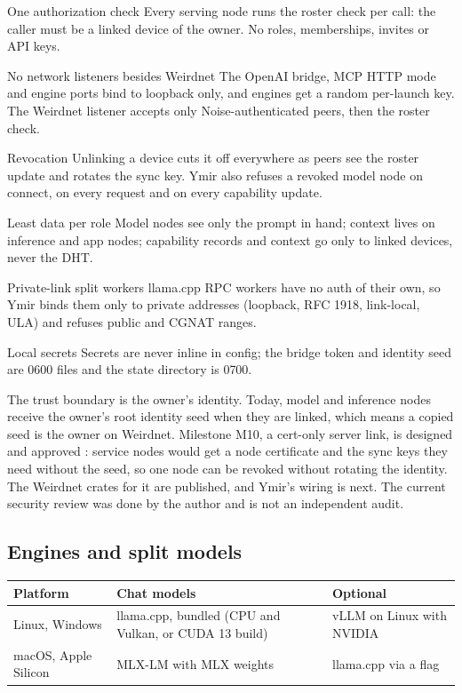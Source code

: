 \begin{rowlist}
  \item[One authorization check] Every serving node runs the roster check per call: the caller must be a linked device of the owner. No roles, memberships, invites or API keys.
  \item[No network listeners besides Weirdnet] The OpenAI bridge, MCP HTTP mode and engine ports bind to loopback only, and engines get a random per-launch key. The Weirdnet listener accepts only Noise-authenticated peers, then the roster check.
  \item[Revocation] Unlinking a device cuts it off everywhere as peers see the roster update and rotates the sync key. Ymir also refuses a revoked model node on connect, on every request and on every capability update.
  \item[Least data per role] Model nodes see only the prompt in hand; context lives on inference and app nodes; capability records and context go only to linked devices, never the DHT.
  \item[Private-link split workers] llama.cpp RPC workers have no auth of their own, so Ymir binds them only to private addresses (loopback, RFC 1918, link-local, ULA) and refuses public and CGNAT ranges.
  \item[Local secrets] Secrets are never inline in config; the bridge token and identity seed are 0600 files and the state directory is 0700.
\end{rowlist}

The trust boundary is the owner's identity. Today, model and inference nodes receive the owner's
root identity seed when they are linked, which means a copied seed is the owner on Weirdnet.
Milestone M10, a cert-only server link, is designed and approved \planned: service nodes would get
a node certificate and the sync keys they need without the seed, so one node can be revoked
without rotating the identity. The Weirdnet crates for it are published, and Ymir's wiring is
next. The current security review was done by the author and is not an independent audit.

\subsection{Engines and split models}\label{sec:engines}

\begin{table}[htbp]
\centering\small
\begin{tabularx}{\linewidth}{@{}lYl@{}}
\toprule
Platform & Chat models & Optional \\
\midrule
Linux, Windows & llama.cpp, bundled (CPU and Vulkan, or CUDA 13 build) & vLLM on Linux with NVIDIA \\
macOS, Apple Silicon & MLX-LM with MLX weights & llama.cpp via a flag \\
\bottomrule
\end{tabularx}
\end{table}

